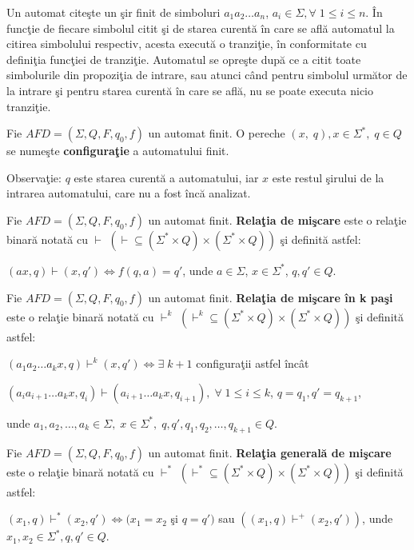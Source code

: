 Un automat citeşte un şir finit de simboluri $a_{1} a_{2} \dots a_{n}$, $a_{i} \in \Sigma, \forall \; 1 \leq i \leq n$. În funcţie de fiecare simbolul citit şi de starea curentă în care se află automatul la citirea simbolului respectiv, acesta execută o tranziţie, în conformitate cu definiţia funcţiei de tranziţie. Automatul se opreşte după ce a citit toate simbolurile din propoziţia de intrare, sau atunci când pentru simbolul următor de la intrare şi pentru starea curentă în care se află, nu se poate executa nicio tranziţie.

\begin{definitie}
Fie $AFD=(\Sigma, Q, F, q_{0}, f)$ un automat finit. O pereche $(x, \; q), x \in \Sigma^{*}, \; q \in Q$ se numeşte \textbf{configuraţie} a automatului finit. 
\end{definitie}

Observaţie:  $q$ este starea curentă a automatului, iar $x$ este restul şirului de la intrarea automatului, care nu a fost încă analizat.

\begin{definitie}
Fie $AFD=(\Sigma, Q, F, q_{0}, f)$ un automat finit. \textbf{Relaţia de mişcare} este o relaţie binară notată cu $\vdash$ $(\vdash \subseteq (\Sigma^{*} \times Q) \times (\Sigma^{*} \times Q))$ şi definită astfel:

$(ax, q) \vdash (x, q') \Leftrightarrow f(q, a) = q'$, unde $a \in \Sigma$, $x \in \Sigma^{*}$, $q, q' \in Q$.
\end{definitie}

\begin{definitie}
Fie $AFD=(\Sigma, Q, F, q_{0}, f)$ un automat finit. \textbf{Relaţia de mişcare în k paşi} este o relaţie binară notată cu $\vdash^{k}$ $(\vdash^{k} \subseteq (\Sigma^{*} \times Q) \times (\Sigma^{*} \times Q))$ şi definită astfel:

$(a_{1} a_{2} \dots a_{k} x, q) \vdash^{k} (x, q') \Leftrightarrow \exists \; k+1$ configuraţii astfel încât 

$(a_{i}a_{i+1} \dots a_{k}x, q_{i}) \vdash (a_{i+1} \dots a_{k}x, q_{i+1}), \; \forall \; 1 \leq i \leq k$, $q = q_{1}, q' = q_{k+1}$, 

unde $a_{1}, a_{2}, \dots, a_{k} \in \Sigma, \; x \in \Sigma^{*}, \; q, q', q_{1}, q_{2}, \dots, q_{k+1} \in Q$.
\end{definitie}

\begin{definitie}
Fie $AFD=(\Sigma, Q, F, q_{0}, f)$ un automat finit. \textbf{Relaţia generală de mişcare} este o relaţie binară notată cu $\vdash^{*}$ $(\vdash^{*} \subseteq (\Sigma^{*} \times Q) \times (\Sigma^{*} \times Q))$ şi definită astfel:

$(x_{1}, q) \vdash^{*} (x_{2}, q') \Leftrightarrow (x_{1} = x_{2}$ şi $q = q')$ sau $((x_{1}, q) \vdash^{+} (x_{2}, q'))$, unde $x_{1}, x_{2} \in \Sigma^{*}, q, q' \in Q$.
\end{definitie}

